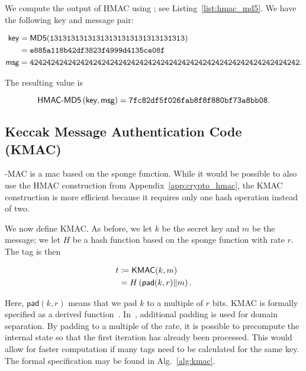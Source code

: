\begin{example}

We compute the output of HMAC using \MDFive{};
see Listing~\ref{list:hmac_md5}.
We have the following key and message pair:

\begin{align}
    \textsf{key} &=
            \textsf{MD5{}}(\texttt{13131313131313131313131313131313})
            \nonumber\\
        &= \texttt{e885a118b42df3823f4999d4135ce08f} \nonumber\\
    \textsf{msg} &= 
    \texttt{4242424242424242424242424242424242424242424242424242424242424242}.
\end{align}

\noindent
The resulting value is

\begin{equation}
    \textsf{HMAC-MD5{}}\left( \textsf{key},\textsf{msg} \right) =
        \texttt{7fc82df5f026fab8f8f880bf73a8bb08}.
\end{equation}


\end{example}


\subsection{Keccak Message Authentication Code (KMAC)}
\label{app:crypto_kmac}

\Keccak{}-MAC is a \gls{mac} based on the \Keccak{} sponge function.
While it would be possible to also use the HMAC construction
from Appendix~\ref{app:crypto_hmac}, the KMAC construction is more efficient
because it requires only one hash operation instead of two.

We now define KMAC.
As before, we let $k$ be the secret key and $m$ be the message;
we let $H$ be a \gls{hash function} based on the \Keccak{} sponge function
with rate $r$.
The tag is then



\begin{align}
    t &\coloneqq{} \textsf{KMAC}(k,m) \nonumber\\
        &= H\left( \textsf{pad}(k,r)\|m \right).
\end{align}

\noindent
Here, $\textsf{pad}(k,r)$ means that we pad $k$ to a multiple of $r$ bits.
KMAC is formally specified as a derived \ShaThree{}
function~\cite{NIST-SP-800-185}.
In~\cite{NIST-SP-800-185},
additional padding is used for domain separation.
By padding to a multiple of the rate, it is possible to precompute
the internal state so that the first iteration has already been processed.
This would allow for faster computation
if many tags need to be calculated for the same key.
The formal specification may be found in
Alg.~\ref{alg:kmac}.

